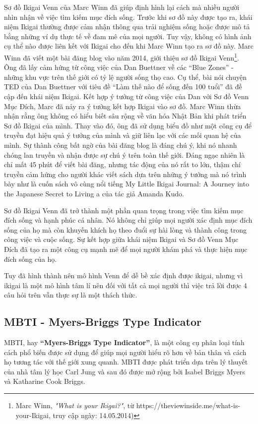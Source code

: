 Sơ đồ Ikigai Venn của Marc Winn đã giúp định hình lại cách mà nhiều người nhìn nhận về việc tìm kiếm mục đích sống. Trước khi sơ đồ này được tạo ra, khái niệm Ikigai thường được cảm nhận thông qua trải nghiệm sống hoặc được mô tả bằng những ví dụ thực tế về đam mê của mọi người. Tuy vậy, không có hình ảnh cụ thể nào được liên kết với Ikigai cho đến khi Marc Winn tạo ra sơ đồ này. Marc Winn đã viết một bài đăng blog vào năm 2014, giới thiệu sơ đồ Ikigai Venn\footnote{Marc Winn, \textit{"What is your Ikigai?"}, từ https://theviewinside.me/what-is-your-Ikigai, truy cập ngày: 14.05.2014)}. Ông đã lấy cảm hứng từ công việc của Dan Buettner về các “Blue Zones” - những khu vực trên thế giới có tỷ lệ người sống thọ cao. Cụ thể, bài nói chuyện TED của Dan Buettner với tiêu đề “Làm thế nào để sống đến 100 tuổi” đã đề cập đến khái niệm Ikigai. Kết hợp ý tưởng từ công việc của Dan với Sơ đồ Venn Mục Đích, Marc đã nảy ra ý tưởng kết hợp Ikigai vào sơ đồ. Marc Winn thừa nhận rằng ông không có hiểu biết sâu rộng về văn hóa Nhật Bản khi phát triển Sơ đồ Ikigai của mình. Thay vào đó, ông đã sử dụng biểu đồ như một công cụ để truyền đạt hiệu quả ý tưởng của mình và giữ liên lạc với các mối quan hệ của mình. Sự thành công bất ngờ của bài đăng blog là đáng chú ý, khi nó nhanh chóng lan truyền và nhận được sự chú ý trên toàn thế giới. Đáng ngạc nhiên là chỉ mất 45 phút để viết bài đăng, nhưng tác động của nó rất to lớn, thậm chí truyền cảm hứng cho người khác viết sách dựa trên những ý tưởng mà nó trình bày như là cuốn sách vô cùng nổi tiếng My Little Ikigai Journal: A Journey into the Japanese Secret to Living a của tác giả Amanda Kudo.

Sơ đồ Ikigai Venn đã trở thành một phần quan trọng trong việc tìm kiếm mục đích sống và hạnh phúc cá nhân. Nó không chỉ giúp mọi người xác định mục đích sống của họ mà còn khuyến khích họ theo đuổi sự hài lòng và thành công trong công việc và cuộc sống. Sự kết hợp giữa khái niệm Ikigai và Sơ đồ Venn Mục Đích đã tạo ra một công cụ mạnh mẽ để mọi người khám phá và thực hiện mục đích sống của họ.

Tuy đã hình thành nên mô hình Venn để dễ bề xác định được ikigai, nhưng vì ikigai là một mô hình tâm lí nên đối với tất cả mọi người thì việc trả lời được 4 câu hỏi trên vẫn thực sự là một thách thức.

\subsection{MBTI - Myers-Briggs Type Indicator}
MBTI, hay \textbf{“Myers-Briggs Type Indicator”}, là một công cụ phân loại tính cách phổ biến được sử dụng để giúp mọi người hiểu rõ hơn về bản thân và cách họ tương tác với thế giới xung quanh. MBTI được phát triển dựa trên lý thuyết của nhà tâm lý học Carl Jung \cite{jung} và sau đó được mở rộng bởi Isabel Briggs Myers và Katharine Cook Briggs.


